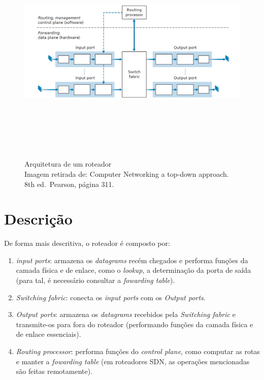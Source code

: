 \begin{figure}[h!]
\centering
\includegraphics[keepaspectratio, width=14cm, height=11cm]{imagens/14/14 - Roteador.png}
\caption{Arquitetura de um roteador \\
Imagem retirada de: Computer Networking a top-down approach. 8th
ed.~Pearson, página 311. \\}
\label{Arquitetura de um roteador}
\end{figure}



\hypertarget{Descrição}{%
\section{Descrição}\label{Descrição}}

De forma mais descritiva, o roteador é composto por:

\begin{enumerate}
\def\labelenumi{\arabic{enumi}.}
\tightlist
\item
  \emph{input ports}: armazena os \emph{datagrams} recém chegados e
  performa funções da camada física e de enlace, como o \emph{lookup}, a
  determinação da porta de saída (para tal, é necessário consultar a
  \emph{fowarding table}).
\item
  \emph{Switching fabric}: conecta os \emph{input ports} com os
  \emph{Output ports}.
\item
  \emph{Output ports}: armazena os \emph{datagrams} recebidos pela
  \emph{Switching fabric} e transmite-os para fora do roteador
  (performando funções da camada física e de enlace essenciais).
\item
  \emph{Routing processor}: performa funções do \emph{control plane},
  como computar as rotas e manter a \emph{fowarding table} (em
  roteadores SDN, as operações mencionadas são feitas remotamente).
\end{enumerate}


